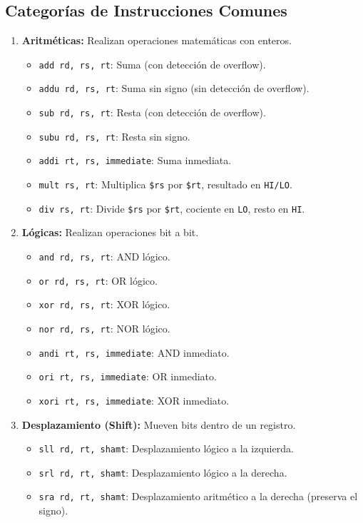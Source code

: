 \documentclass[letterpaper]{article}
\begin{document}
	\subsection{Categorías de Instrucciones Comunes}
	\begin{enumerate}
		\item \textbf{Aritméticas:} Realizan operaciones matemáticas con enteros.
		\begin{itemize}
			\item \texttt{add rd, rs, rt}: Suma (con detección de overflow).
			\item \texttt{addu rd, rs, rt}: Suma sin signo (sin detección de overflow).
			\item \texttt{sub rd, rs, rt}: Resta (con detección de overflow).
			\item \texttt{subu rd, rs, rt}: Resta sin signo.
			\item \texttt{addi rt, rs, immediate}: Suma inmediata.
			\item \texttt{mult rs, rt}: Multiplica \texttt{\$rs} por \texttt{\$rt}, resultado en \texttt{HI/LO}.
			\item \texttt{div rs, rt}: Divide \texttt{\$rs} por \texttt{\$rt}, cociente en \texttt{LO}, resto en \texttt{HI}.
		\end{itemize}
		
		\item \textbf{Lógicas:} Realizan operaciones bit a bit.
		\begin{itemize}
			\item \texttt{and rd, rs, rt}: AND lógico.
			\item \texttt{or rd, rs, rt}: OR lógico.
			\item \texttt{xor rd, rs, rt}: XOR lógico.
			\item \texttt{nor rd, rs, rt}: NOR lógico.
			\item \texttt{andi rt, rs, immediate}: AND inmediato.
			\item \texttt{ori rt, rs, immediate}: OR inmediato.
			\item \texttt{xori rt, rs, immediate}: XOR inmediato.
		\end{itemize}
		
		\item \textbf{Desplazamiento (Shift):} Mueven bits dentro de un registro.
		\begin{itemize}
			\item \texttt{sll rd, rt, shamt}: Desplazamiento lógico a la izquierda.
			\item \texttt{srl rd, rt, shamt}: Desplazamiento lógico a la derecha.
			\item \texttt{sra rd, rt, shamt}: Desplazamiento aritmético a la derecha (preserva el signo).
		\end{itemize}
		

\end{enumerate}
\end{document}
